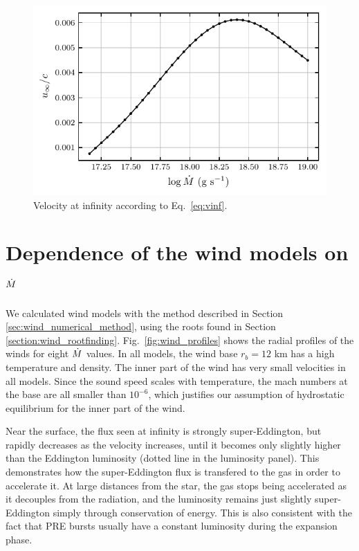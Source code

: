 \documentclass[../main.tex]{subfiles}
\begin{document}
\begin{figure}[htb!]
    \centering
    \includegraphics{figures/wind_vinf.pdf}
    \caption[Velocity at infinity of wind models]{Velocity at infinity according to Eq.~\eqref{eq:vinf}.}
    \label{fig:wind_vinf}
\end{figure}


\section{Dependence of the wind models on $\dot{M}$}\label{sec:wind_results}

We calculated wind models with the method described in Section \ref{sec:wind_numerical_method}, using the roots found in Section \ref{section:wind_rootfinding}. Fig.~\ref{fig:wind_profiles} shows the radial profiles of the winds for eight $\dot{M}$ values. In all models, the wind base $r_b=12$ km has a high temperature and density. The inner part of the wind has very small velocities in all models. Since the sound speed scales with temperature, the mach numbers at the base are all smaller than $10^{-6}$, which justifies our assumption of hydrostatic equilibrium for the inner part of the wind.   

Near the surface, the flux seen at infinity is strongly super-Eddington, but rapidly decreases as the velocity increases, until it becomes only slightly higher than the Eddington luminosity (dotted line in the luminosity panel). This demonstrates how the super-Eddington flux is transfered to the gas in order to accelerate it. At large distances from the star, the gas stops being accelerated as it decouples from the radiation, and the luminosity remains just slightly super-Eddington simply through conservation of energy. This is also consistent with the fact that PRE bursts usually have a constant luminosity during the expansion phase.  
\end{document}
